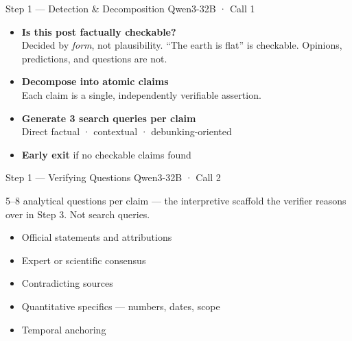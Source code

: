 \documentclass[11pt, aspectratio=169]{beamer}
\begin{document}
\begin{frame}{Step 1 — Detection \& Decomposition \hfill \normalsize\textcolor{slate}{Qwen3-32B · Call 1}}

  \begin{itemize}\setlength{\itemsep}{14pt}
    \item \textbf{Is this post factually checkable?}\\
          Decided by \emph{form}, not plausibility.
          ``The earth is flat'' is checkable. Opinions, predictions, and questions are not.
    \item \textbf{Decompose into atomic claims}\\
          Each claim is a single, independently verifiable assertion.
    \item \textbf{Generate 3 search queries per claim}\\
          Direct factual · contextual · debunking-oriented
    \item \textbf{Early exit} if no checkable claims found
  \end{itemize}
\end{frame}

\begin{frame}{Step 1 — Verifying Questions \hfill \normalsize\textcolor{slate}{Qwen3-32B · Call 2}}

  5--8 \alert{analytical questions} per claim — the interpretive scaffold the verifier
  reasons over in Step 3. Not search queries.

  \bigskip
  \begin{itemize}\setlength{\itemsep}{12pt}
    \item Official statements and attributions
    \item Expert or scientific consensus
    \item Contradicting sources
    \item Quantitative specifics — numbers, dates, scope
    \item Temporal anchoring
  \end{itemize}
\end{frame}
\end{document}

